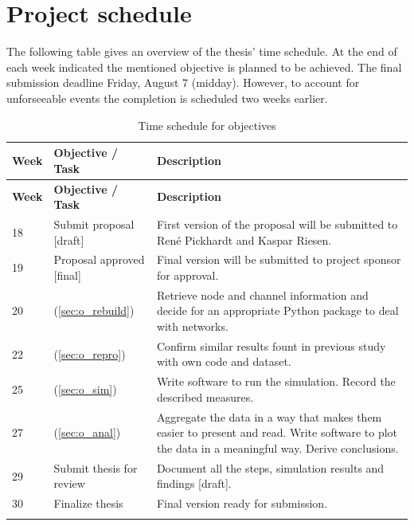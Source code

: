 \documentclass[final]{fhnwreport}       %
\begin{document}
\section{Project schedule}
The following table gives an overview of the thesis' time schedule. At the end of each week indicated the mentioned objective is planned to be achieved. The final submission deadline Friday, August 7 (midday). However, to account for unforseeable events the completion is scheduled two weeks earlier.

\renewcommand{\arraystretch}{1.5} %
\begin{longtable}[l]{l|p{4cm}|p{9cm}} %
\normalfont\textbf{Week} & \normalfont\textbf{Objective / Task} & \normalfont\textbf{Description} \\
\hline

\endfirsthead %
\normalfont\textbf{Week} & \normalfont\textbf{Objective / Task} & \normalfont\textbf{Description} \\
\hline
\endhead %

18 & Submit proposal [draft] & First version of the proposal will be submitted to René Pickhardt and Kaspar Riesen. \\
19 & Proposal approved [final] & Final version will be submitted to project sponsor for approval. \\
20 & \nameref{sec:o_rebuild} (\ref{sec:o_rebuild}) & Retrieve node and channel information and decide for an appropriate Python package to deal with networks.  \\
22 & \nameref{sec:o_repro} (\ref{sec:o_repro}) & Confirm similar results fount in previous study \cite{pickhardt_imbalance_2019} with own code and dataset. \\

25 & \nameref{sec:o_sim} (\ref{sec:o_sim}) & Write software to run the simulation. Record the described measures.  \\

27 & \nameref{sec:o_anal} (\ref{sec:o_anal}) & Aggregate the data in a way that makes them easier to present and read. Write software to plot the data in a meaningful way. Derive conclusions.  \\
29 & Submit thesis for review & Document all the steps, simulation results and findings [draft].  \\
30 & Finalize thesis & Final version ready for submission. \\

\caption{Time schedule for objectives}
\label{tab:Table1}

\end{longtable}
\end{document}

